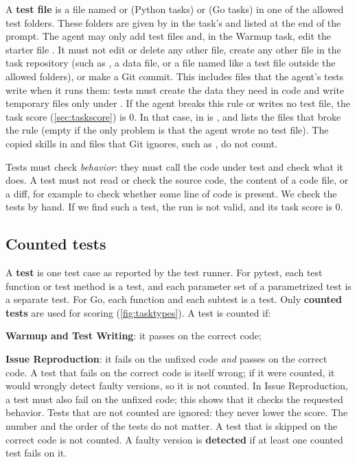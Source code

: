 \documentclass[letterpaper,11pt]{article}
\begin{document}
A \textbf{test file} is a file named  or 
(Python tasks) or  (Go tasks) in one of the allowed test folders. These folders are given by 
in the task's  and listed at the end of the prompt. The agent may only add test files and, in the Warmup task, edit the starter file
. It must not edit or delete any other file, create any
other file in the task repository (such as , a data file, or a file
named like a test file outside the allowed folders), or make a Git commit. This
includes files that the agent's tests write when it runs them: tests must
create the data they need in code and write temporary files only under
. If the agent breaks this rule or writes no test file, the task score
(\autoref{sec:taskscore}) is 0. In that case,  in
 is , and  lists the files that broke
the rule (empty if the only problem is that the agent wrote no test file). The copied skills in  and files that Git ignores, such as
, do not count.

Tests must check \emph{behavior}: they must call the code under test and
check what it does. A test must not read or check the source code, the
content of a code file, or a diff, for example to check whether some line of
code is present. We check the tests by hand. If we find such a test, the run
is not valid, and its task score is 0.

\subsection{Counted tests}
\label{sec:counted}

A \textbf{test} is one test case as reported by the test runner. For pytest, each test function or test method is a test, and each parameter set of a parametrized test is
a separate test. For Go, each  function and each subtest is a test.
Only
\textbf{counted tests} are used for scoring
(\autoref{fig:tasktypes}). A test is counted if:
\squishlist
 \item \textbf{Warmup and Test Writing}: it passes on the correct code;
 \item \textbf{Issue Reproduction}: it fails on the unfixed code \emph{and}
   passes on the correct code.
\squishend
A test that fails on the correct code is itself wrong; if it were counted, it
would wrongly detect faulty versions, so it is not counted. In Issue Reproduction, a test must also
fail on the unfixed code; this shows that it checks the requested behavior.
Tests that are not counted are ignored: they never lower the score. The number and the order of the tests do not matter. A test that is skipped on
the correct code is not counted. A faulty version is
\textbf{detected} if at least one counted test fails on it.
\end{document}
